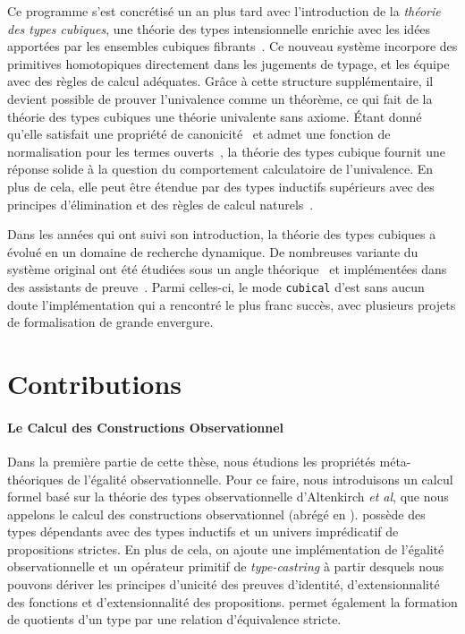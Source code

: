 Ce programme s'est concrétisé un an plus tard avec l'introduction de la 
\emph{théorie des types cubiques}, une théorie des types intensionnelle enrichie 
avec les idées apportées par les ensembles cubiques fibrants~.
% 
Ce nouveau système incorpore des primitives homotopiques directement dans les 
jugements de typage, et les équipe avec des règles de calcul adéquates. 
% 
Grâce à cette structure supplémentaire, il devient possible de prouver 
l'univalence comme un théorème, ce qui fait de la théorie des types cubiques une théorie 
univalente sans axiome.
% 
Étant donné qu'elle satisfait une propriété de canonicité~ et admet 
une fonction de normalisation pour les termes ouverts~, 
la théorie des types cubique fournit une réponse solide à la question du comportement 
calculatoire de l'univalence.
% 
En plus de cela, elle peut être étendue par des types inductifs supérieurs avec des 
principes d'élimination et des règles de calcul naturels~.

Dans les années qui ont suivi son introduction, la théorie des types cubiques a 
évolué en un domaine de recherche dynamique. 
% 
De nombreuses variante du système original ont été étudiées sous un angle 
théorique~\cite{AngiuliHouHarper18,ABCFHL} et implémentées dans des assistants de 
preuve~\cite{Cubicaltt, redtt}. 
% 
Parmi celles-ci, le mode \texttt{cubical} d'\Agda est sans aucun doute l'implémentation 
qui a rencontré le plus franc succès, avec plusieurs projets de formalisation de 
grande envergure.

\section{Contributions}

\paragraph{Le Calcul des Constructions Observationnel}
% 
Dans la première partie de cette thèse, nous étudions les propriétés méta-théoriques 
de l'égalité observationnelle. 
% 
Pour ce faire, nous introduisons un calcul formel basé sur la théorie des types 
observationnelle d'Altenkirch \textit{et al}, que nous appelons le calcul 
des constructions observationnel (abrégé en \SetoidCC). 
% 
\SetoidCC possède des types dépendants avec des types inductifs et un univers 
imprédicatif de propositions strictes. 
% 
En plus de cela, on ajoute une implémentation de l'égalité observationnelle 
et un opérateur primitif de \emph{type-castring} à partir desquels nous pouvons 
dériver les principes d'unicité des preuves d'identité, d'extensionnalité des 
fonctions et d'extensionnalité des propositions.
% 
\SetoidCC permet également la formation de quotients d'un type par une relation 
d'équivalence stricte.

